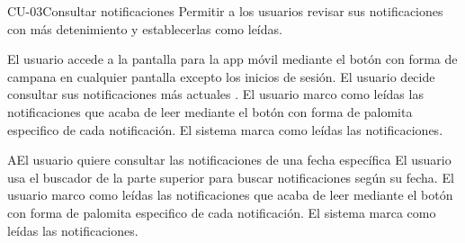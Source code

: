 
\begin{UseCase}{CU-03}{Consultar notificaciones}{
    Permitir a los usuarios revisar sus notificaciones con más detenimiento y establecerlas como leídas.
}

\end{UseCase}

\begin{UCtrayectoria}
    \UCpaso[\UCactor] El usuario accede a la pantalla \label{CU03.introduceDatos} para la app móvil  mediante el botón con forma de campana en cualquier pantalla excepto los inicios de sesión.
    \UCpaso[\UCactor] El usuario decide consultar sus notificaciones más actuales .
    \UCpaso[\UCactor] El usuario marco como leídas las notificaciones que acaba de leer mediante el botón con forma de palomita especifico de cada notificación.
    \UCpaso El sistema marca como leídas las notificaciones.

\end{UCtrayectoria}

\begin{UCtrayectoriaA}{A}{El usuario quiere consultar las notificaciones de una fecha específica}
	\UCpaso[\UCactor] El usuario usa el buscador de la parte superior para buscar notificaciones según su fecha.
	\UCpaso[\UCactor] El usuario marco como leídas las notificaciones que acaba de leer mediante el botón con forma de palomita especifico de cada notificación.
	\UCpaso El sistema marca como leídas las notificaciones.

\end{UCtrayectoriaA}


